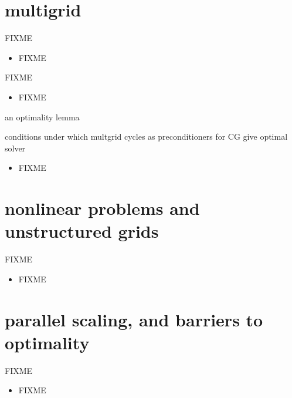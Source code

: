 \documentclass[hide notes,intlimits,usenames,dvipsnames]{beamer}
\begin{document}
\section{multigrid}

\begin{frame}{FIXME}
\begin{itemize}
\item FIXME
\end{itemize}
\end{frame}

\begin{frame}{FIXME}
\begin{itemize}
\item FIXME
\end{itemize}
\end{frame}

\begin{frame}{an optimality lemma}

conditions under which multgrid cycles as preconditioners for CG give optimal solver
\begin{itemize}
\item FIXME
\end{itemize}
\end{frame}


\section{nonlinear problems and unstructured grids}

\begin{frame}{FIXME}
\begin{itemize}
\item FIXME
\end{itemize}
\end{frame}



\section{parallel scaling, and barriers to optimality}

\begin{frame}{FIXME}
\begin{itemize}
\item FIXME
\end{itemize}
\end{frame}
\end{document}
